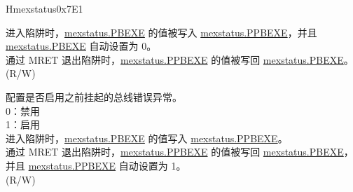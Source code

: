 \begin{register}{H}{mexstatus}{0x7E1}
\begin{regdesc}
\begin{reglist}
进入陷阱时，\hyperref[fielddesc:MEXSTATUS_PBEXE]{mexstatus.PBEXE} 的值被写入 \hyperref[fielddesc:MEXSTATUS_PPBEXE]{mexstatus.PPBEXE}，并且 \hyperref[fielddesc:MEXSTATUS_PBEXE]{mexstatus.PBEXE} 自动设置为 0。\\
通过 MRET 退出陷阱时，\hyperref[fielddesc:MEXSTATUS_PPBEXE]{mexstatus.PPBEXE} 的值被写回 \hyperref[fielddesc:MEXSTATUS_PBEXE]{mexstatus.PBEXE}。\\
(R/W)
\label{fielddesc:MEXSTATUS_PPBEXE}\item [PPBEXE] 配置是否启用之前挂起的总线错误异常。\\
0：禁用\\
1：启用\\
进入陷阱时，\hyperref[fielddesc:MEXSTATUS_PBEXE]{mexstatus.PBEXE} 的值写入 \hyperref[fielddesc:MEXSTATUS_PPBEXE]{mexstatus.PPBEXE}。\\
通过 MRET 退出陷阱时，\hyperref[fielddesc:MEXSTATUS_PPBEXE]{mexstatus.PPBEXE} 的值被写回 \hyperref[fielddesc:MEXSTATUS_PBEXE]{mexstatus.PBEXE}，并且 \hyperref[fielddesc:MEXSTATUS_PPBEXE]{mexstatus.PPBEXE} 自动设置为 1。\\
(R/W)
\item [见下页……]
\end{reglist}\end{regdesc}
\end{register}
\addtocounter{Regfloat}{-1}
